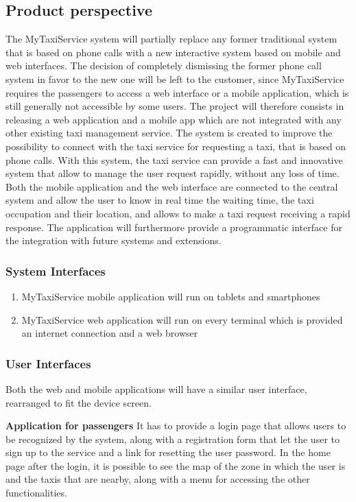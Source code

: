 \documentclass[11pt, a4paper,titlepage]{article}
\newcommand{\productname}{MyTaxiService }
\begin{document}
\subsection{Product perspective}
The \productname system will partially replace any former traditional system that is based on phone calls with a new interactive system based on mobile and web interfaces. \newline
The decision of completely dismissing the former phone call system in favor to the new one will be left to the customer, since \productname requires the passengers to access a web interface or a mobile application, which is still generally not accessible by some users.
\newline
The project will therefore consists in releasing a web application and a mobile app which are not integrated with any other existing taxi management service.
The system is created to improve the possibility to connect with the taxi service for requesting a taxi, that is based on phone calls.
With this system, the taxi service can provide a fast and innovative system that allow to manage the user request rapidly, without any loss of time.
Both the mobile application and the web interface are connected to the central system and allow the user to know in real time the waiting time, the taxi occupation and their location, and allows to make a taxi request receiving a rapid response.
The application will furthermore provide a programmatic interface for the integration with future systems and extensions.
\subsubsection{System Interfaces}
	\begin{enumerate}
		\item \productname mobile application will run on tablets and smartphones
		\item \productname web application will run on every terminal which is provided an internet connection and a web browser
	\end{enumerate}
\subsubsection{User Interfaces}
Both the web and mobile applications will have a similar user interface, rearranged to fit the device screen.

\textbf{Application for passengers}
It has to provide a login page that allows users to be recognized by the system, along with a registration form that let the user to sign up to the service and a link for resetting the user password.
In the home page after the login, it is possible to see the map of the zone in which the user is and the taxis that are nearby, along with a menu for accessing the other functionalities.
\end{document}
